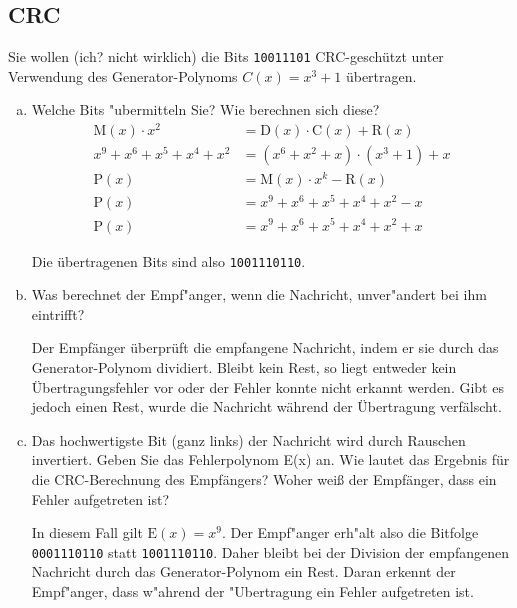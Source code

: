 \setcounter{section}{3}
\setcounter{subsection}{4} %
\subsection{CRC}

Sie wollen (ich? nicht wirklich) die Bits \verb|10011101| CRC-geschützt unter
Verwendung des Generator-Polynoms $C(x) = x^3 + 1$ übertragen.
\begin{enumerate}[(a)]
    \item Welche Bits "ubermitteln Sie? Wie berechnen sich diese?
        \begin{align*}
            \text{M}(x) \cdot x^2       &= \text{D}(x) \cdot \text{C}(x) + \text{R}(x) \\
            x^9 + x^6 + x^5 + x^4 + x^2 &= (x^6 + x^2 + x) \cdot (x^3 + 1) + x \\[10pt]
            \text{P}(x)                 &= \text{M}(x) \cdot x^k - \text{R}(x) \\
            \text{P}(x)                 &= x^9 + x^6 + x^5 + x^4 + x^2 - x \\
            \text{P}(x)                 &= x^9 + x^6 + x^5 + x^4 + x^2 + x
        \end{align*}

        Die übertragenen Bits sind also \verb|1001110110|.

    \item Was berechnet der Empf"anger, wenn die Nachricht, unver"andert bei ihm eintrifft?

        Der Empfänger überprüft die empfangene Nachricht, indem er sie durch
        das Generator-Polynom dividiert. Bleibt kein Rest, so liegt entweder kein
        Übertragungsfehler vor oder der Fehler konnte nicht erkannt werden.
        Gibt es jedoch einen Rest, wurde die Nachricht während der Übertragung
        verfälscht.

    \item Das hochwertigste Bit (ganz links) der Nachricht wird durch Rauschen
        invertiert. Geben Sie das Fehlerpolynom E(x) an. Wie lautet das
        Ergebnis für die CRC-Berechnung des Empfängers? Woher weiß der
        Empfänger, dass ein Fehler aufgetreten ist?

        In diesem Fall gilt $\text{E}(x) = x^9$. Der Empf"anger erh"alt also
        die Bitfolge \verb|0001110110| statt \verb|1001110110|. Daher bleibt
        bei der Division der empfangenen Nachricht durch das Generator-Polynom
        ein Rest. Daran erkennt der Empf"anger, dass w"ahrend der "Ubertragung ein
        Fehler aufgetreten ist.


\end{enumerate}
